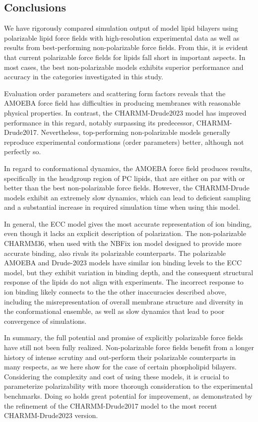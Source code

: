 \documentclass[journal=jacsat,manuscript=article,layout=singlecolumn]{achemso}
\begin{document}
\subsection{Conclusions}
We have rigorously compared simulation output of model lipid bilayers using polarizable lipid force fields with high-resolution experimental data as well as results from best-performing non-polarizable force fields. From this, it is evident that current polarizable force fields for lipids fall short in important aspects. In most cases, the best non-polarizable models exhibits superior performance and accuracy in the categories investigated in this study.

Evaluation order parameters and scattering form factors reveals that the AMOEBA force field has difficulties in producing membranes with reasonable physical properties. In contrast, the CHARMM-Drude2023 model has improved performance in this regard, notably surpassing its predecessor, CHARMM-Drude2017. Nevertheless, top-performing non-polarizable models generally reproduce experimental conformations (order parameters) better, although not perfectly so.

In regard to conformational dynamics, the AMOEBA force field produces results, specifically in the headgroup region of PC lipids, that are either on par with or better than the best non-polarizable force fields. However, the CHARMM-Drude models exhibit an extremely slow dynamics, which can lead to deficient sampling and a substantial increase in required simulation time when using this model.


In general, the ECC model gives the most accurate representation of ion binding, even though it lacks an explicit description of polarization. The non-polarizable CHARMM36, when used with the NBFix ion model designed to provide more accurate binding, also rivals its polarizable counterparts. The polarizable AMOEBA and Drude-2023 models have similar ion binding levels to the ECC model, but they exhibit variation in binding depth, and the consequent structural response of the lipids do not align with experiments. The incorrect response to ion binding likely connects to the the other inaccuracies described above, including the misrepresentation of overall membrane structure and diversity in the conformational ensemble, as well as slow dynamics that lead to poor convergence of simulations. 

 In summary, the full potential and promise of explicitly polarizable force fields have still not been fully realized. Non-polarizable force fields benefit from a longer history of intense scrutiny and out-perform their polarizable counterparts in many respects, as we here show for the case of certain phospholipid bilayers. Considering the complexity and cost of using these models, it is crucial to parameterize polarizability with more thorough consideration to the experimental benchmarks. Doing so holds great potential for improvement, as demonstrated by the refinement of the CHARMM-Drude2017 model to the most recent CHARMM-Drude2023 version.
\end{document}
